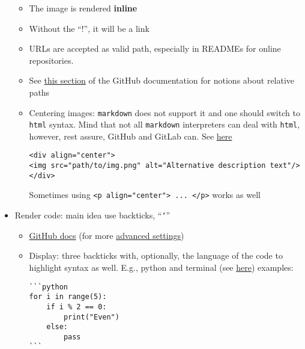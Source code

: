 \documentclass[a4paper,12pt,%
              final%
              ]{article}
\begin{document}
\begin{itemize}
\begin{itemize}
      \item The image is rendered \textbf{inline}
      \item Without the ``!'', it will be a link
      \item URLs are accepted as valid path, especially in READMEs for online repositories.
      \item See \href{https://docs.github.com/en/get-started/writing-on-github/getting-started-with-writing-and-formatting-on-github/basic-writing-and-formatting-syntax#images}{this section} of the GitHub documentation for notions about relative paths
      \item Centering images: \texttt{markdown} does not support it and one should switch to \texttt{html} syntax. Mind that not all \texttt{markdown} interpreters can deal with \texttt{html}, however, rest assure, GitHub and GitLab can. See \href{https://stackoverflow.com/questions/12090472/how-do-i-center-an-image-in-the-readme-md-file-on-github}{here}
\begin{verbatim}
<div align="center">
<img src="path/to/img.png" alt="Alternative description text"/>
</div>
\end{verbatim}
        Sometimes using \verb|<p align="center"> ... </p>| works as well
    \end{itemize}
  \item Render code: main idea use backticks, ``\texttt{`}''
    \begin{itemize}
      \item \href{https://docs.github.com/en/get-started/writing-on-github/getting-started-with-writing-and-formatting-on-github/basic-writing-and-formatting-syntax#quoting-code}{GitHub docs}
        (for more \href{https://docs.github.com/en/get-started/writing-on-github/working-with-advanced-formatting/creating-and-highlighting-code-blocks}{advanced settings})
      \item Display: three backticks with, optionally, the language of the code to highlight syntax as well. E.g., python and terminal (see \href{https://stackoverflow.com/a/49004070/12152457}{here}) examples:
\begin{verbatim}
```python
for i in range(5):
    if i % 2 == 0:
        print("Even")
    else:
        pass
```


\end{verbatim}
\end{itemize}
\end{itemize}
\end{document}
